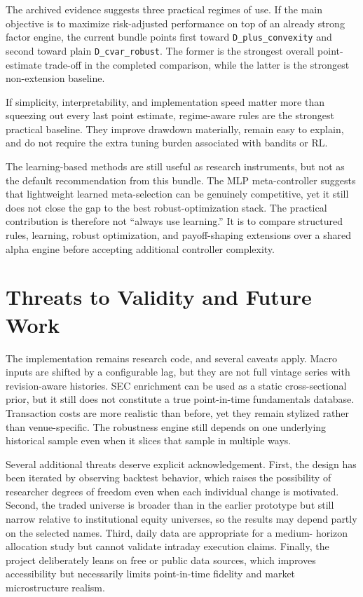 \documentclass[11pt]{article}
\begin{document}
The archived evidence suggests three practical regimes of use. If the main
objective is to maximize risk-adjusted performance on top of an already strong
factor engine, the current bundle points first toward
\texttt{D\_plus\_convexity} and second toward plain \texttt{D\_cvar\_robust}.
The former is the strongest overall point-estimate trade-off in the completed
comparison, while the latter is the strongest non-extension baseline.

If simplicity, interpretability, and implementation speed matter more than
squeezing out every last point estimate, regime-aware rules are the strongest
practical baseline. They improve drawdown materially, remain easy to explain,
and do not require the extra tuning burden associated with bandits or RL.

The learning-based methods are still useful as research instruments, but not as
the default recommendation from this bundle. The MLP meta-controller suggests
that lightweight learned meta-selection can be genuinely competitive, yet it
still does not close the gap to the best robust-optimization stack. The
practical contribution is therefore not ``always use learning.'' It is to
compare structured rules, learning, robust optimization, and payoff-shaping
extensions over a shared alpha engine before accepting additional controller
complexity.

\section{Threats to Validity and Future Work}

The implementation remains research code, and several caveats apply. Macro
inputs are shifted by a configurable lag, but they are not full vintage series
with revision-aware histories. SEC enrichment can be used as a static
cross-sectional prior, but it still does not constitute a true point-in-time
fundamentals database. Transaction costs are more realistic than before, yet
they remain stylized rather than venue-specific. The robustness engine still
depends on one underlying historical sample even when it slices that sample in
multiple ways.

Several additional threats deserve explicit acknowledgement. First, the design
has been iterated by observing backtest behavior, which raises the possibility
of researcher degrees of freedom even when each individual change is motivated.
Second, the traded universe is broader than in the earlier prototype but still
narrow relative to institutional equity universes, so the results may depend
partly on the selected names. Third, daily data are appropriate for a medium-
horizon allocation study but cannot validate intraday execution claims. Finally,
the project deliberately leans on free or public data sources, which improves
accessibility but necessarily limits point-in-time fidelity and market
microstructure realism.
\end{document}
